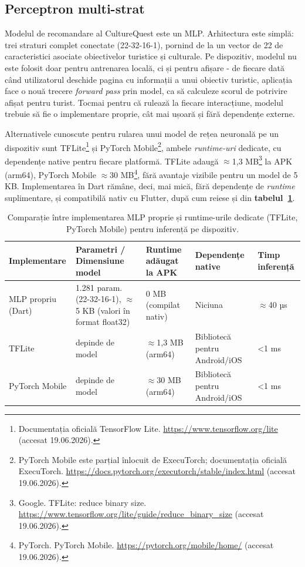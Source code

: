 \documentclass[12pt,a4paper]{report}
\begin{document}
\subsection{Perceptron multi-strat}

Modelul de recomandare al CultureQuest este un MLP. Arhitectura este simplă: trei straturi complet conectate (22-32-16-1), pornind de la un vector de 22 de caracteristici asociate obiectivelor turistice și culturale. Pe dispozitiv, modelul nu este folosit doar pentru antrenarea locală, ci și pentru afișare - de fiecare dată când utilizatorul deschide pagina cu informații a unui obiectiv turistic, aplicația face o nouă trecere \textit{forward pass} prin model, ca să calculeze scorul de potrivire afișat pentru turist. Tocmai pentru că rulează la fiecare interacțiune, modelul trebuie să fie o implementare proprie, cât mai ușoară și fără dependențe externe.

Alternativele cunoscute pentru rularea unui model de rețea neuronală pe un dispozitiv sunt TFLite\footnote{Documentația oficială TensorFlow Lite. \url{https://www.tensorflow.org/lite} (accesat 19.06.2026).} și PyTorch Mobile\footnote{PyTorch Mobile este parțial înlocuit de ExecuTorch; documentația oficială ExecuTorch. \url{https://docs.pytorch.org/executorch/stable/index.html} (accesat 19.06.2026).}, ambele \textit{runtime-uri} dedicate, cu dependențe native pentru fiecare platformă. TFLite adaugă $\approx$1,3 MB\footnote{Google. TFLite: reduce binary size. \url{https://www.tensorflow.org/lite/guide/reduce_binary_size} (accesat 19.06.2026).} la APK (arm64), PyTorch Mobile $\approx$30 MB\footnote{PyTorch. PyTorch Mobile. \url{https://pytorch.org/mobile/home/} (accesat 19.06.2026).}, fără avantaje vizibile pentru un model de 5 KB. Implementarea în Dart rămâne, deci, mai mică, fără dependențe de \textit{runtime} suplimentare, și compatibilă nativ cu Flutter, după cum reiese și din \textbf{tabelul~\ref{tab:mlp-comparativ}}.

\clearpage
\begin{table}[h]
\centering
\footnotesize
\caption{Comparație între implementarea MLP proprie și runtime-urile dedicate (TFLite, PyTorch Mobile) pentru inferență pe dispozitiv.}
\label{tab:mlp-comparativ}
\begin{tabular}{|l|p{3.2cm}|p{2.8cm}|p{2.5cm}|p{2cm}|}
\hline
\textbf{Implementare} & \textbf{Parametri / Dimensiune model} & \textbf{Runtime adăugat la APK} & \textbf{Dependențe native} & \textbf{Timp inferență} \\
\hline
MLP propriu (Dart) & 1.281 param. (22-32-16-1), $\approx$5 KB (valori în format float32) & 0 MB (compilat nativ) & Niciuna & $\approx$40 µs \\
\hline
TFLite & depinde de model & $\approx$1,3 MB (arm64) & Bibliotecă pentru Android/iOS & <1 ms \\
\hline
PyTorch Mobile & depinde de model & $\approx$30 MB (arm64) & Bibliotecă pentru Android/iOS & <1 ms \\
\hline
\end{tabular}
\end{table}
\end{document}
